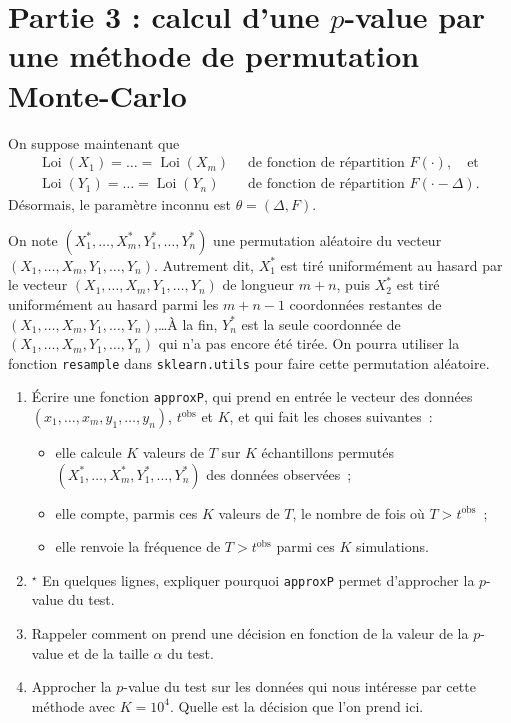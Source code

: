 \documentclass[a4paper,12pt,twosided]{article}
\newcommand{\loi}{\operatorname{Loi}}
\theoremstyle{definition}
\begin{document}
\section*{Partie 3 : calcul d'une $p$-value par une méthode de permutation Monte-Carlo}

On suppose maintenant que 
\begin{align}
  \label{eq:loi3}
  \loi(X_1) = \ldots = \loi(X_m) &\ \text{ de fonction de répartition }F(\cdot), \quad \text{et} \
  \\
  \label{eq:loi4}
  \loi(Y_1) = \ldots = \loi(Y_n) &\ \text{ de fonction de répartition }F(\cdot-\Delta).
\end{align}
Désormais, le paramètre inconnu est $\theta = (\Delta, F)$.

On note $(X_1^\ast,\ldots,X_m^\ast, Y_1^\ast, \ldots, Y_n^\ast)$ une permutation aléatoire du
vecteur $(X_1,\ldots, X_m, Y_1,\ldots, Y_n)$. Autrement dit, $X_1^\ast$ est tiré uniformément au hasard par le
vecteur $(X_1,\ldots, X_m, Y_1,\ldots, Y_n)$ de longueur $m+n$, puis $X_2^\ast$ est tiré
uniformément au hasard parmi les $m+n-1$ coordonnées restantes de $(X_1,\ldots, X_m, Y_1,\ldots,
Y_n)$,\ldots À la fin, $Y_n^\ast$ est la seule coordonnée de $(X_1,\ldots, X_m, Y_1,\ldots,
Y_n)$ qui n'a pas encore été tirée.
On pourra utiliser la fonction \verb+resample+ dans \verb+sklearn.utils+ pour faire cette
permutation aléatoire.

\begin{enumerate}[\bf {3.}1.]
\item Écrire une fonction \verb+approxP+, qui prend en entrée le vecteur des données $(x_1,\ldots,
  x_m, y_1, \ldots, y_n)$, $t^\text{obs}$ et $K$, et qui fait les
  choses suivantes~:
  \begin{itemize}
  \item elle calcule $K$ valeurs de $T$ sur $K$ échantillons permutés $(X_1^\ast,\ldots,X_m^\ast,
    Y_1^\ast, \ldots, Y_n^\ast)$ des données observées~;
  \item elle compte, parmis ces $K$ valeurs de $T$, le nombre de fois où $T>t^\text{obs}$~;
  \item elle renvoie la fréquence de $T>t^\text{obs}$ parmi ces $K$ simulations.
  \end{itemize}
\item $^\star$ En quelques lignes, expliquer pourquoi \verb+approxP+ permet d'approcher la $p$-value
  du test.
\item Rappeler comment on prend une décision en fonction de la valeur de la $p$-value et de la
  taille $\alpha$ du test.
\item Approcher la $p$-value du test sur les données qui nous intéresse par cette méthode avec
  $K=10^4$. Quelle est la décision que l'on prend ici.
\end{enumerate}
\end{document}
